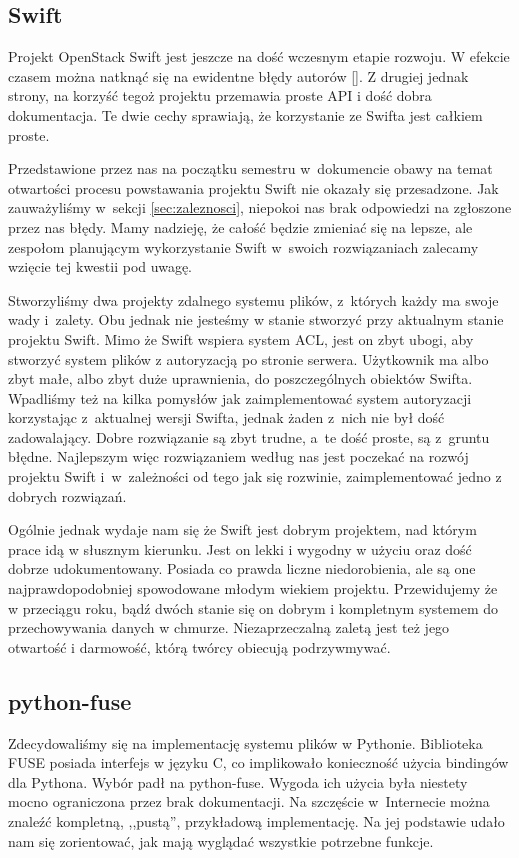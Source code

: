 \subsection{Swift}

Projekt OpenStack Swift jest jeszcze na dość wczesnym etapie rozwoju. W
efekcie czasem można natknąć się na ewidentne błędy autorów []. Z drugiej jednak strony, na korzyść tegoż projektu przemawia proste
API i dość dobra dokumentacja. Te dwie cechy sprawiają, że korzystanie ze
Swifta jest całkiem proste.

Przedstawione przez nas na początku semestru w~dokumencie \cite{jano-anal-atech}
obawy na temat otwartości procesu powstawania projektu Swift nie okazały się
przesadzone. Jak zauważyliśmy w~sekcji \ref{sec:zaleznosci}, niepokoi nas brak
odpowiedzi na zgłoszone przez nas błędy. Mamy nadzieję, że całość będzie
zmieniać się na lepsze, ale zespołom planującym wykorzystanie Swift w~swoich
rozwiązaniach zalecamy wzięcie tej kwestii pod uwagę.

Stworzyliśmy dwa projekty zdalnego systemu plików, z~których każdy ma swoje
wady i~zalety. Obu jednak nie jesteśmy w stanie stworzyć przy aktualnym stanie
projektu Swift. Mimo że Swift wspiera system ACL, jest on zbyt ubogi, aby
stworzyć system plików z autoryzacją po stronie serwera. Użytkownik ma albo zbyt
małe, albo zbyt duże uprawnienia, do poszczególnych obiektów Swifta. Wpadliśmy
też na kilka pomysłów jak zaimplementować system autoryzacji korzystając
z~aktualnej wersji Swifta, jednak żaden z~nich nie był dość zadowalający. Dobre
rozwiązanie są zbyt trudne, a~te dość proste, są z~gruntu błędne. Najlepszym
więc rozwiązaniem według nas jest poczekać na rozwój projektu Swift
i~w~zależności od tego jak się rozwinie, zaimplementować jedno z dobrych
rozwiązań.

Ogólnie jednak wydaje nam się że Swift jest dobrym projektem, nad którym prace
idą w słusznym kierunku. Jest on lekki i wygodny w użyciu oraz dość dobrze
udokumentowany. Posiada co prawda liczne niedorobienia, ale są one
najprawdopodobniej spowodowane młodym wiekiem projektu. Przewidujemy że w
przeciągu roku, bądź dwóch stanie się on dobrym i kompletnym systemem
do przechowywania danych w chmurze. Niezaprzeczalną zaletą jest też jego
otwartość i darmowość, którą twórcy obiecują podrzywmywać.

\subsection{python-fuse}

Zdecydowaliśmy się na implementację systemu plików w Pythonie. Biblioteka FUSE
posiada interfejs w języku C, co implikowało konieczność użycia bindingów dla
Pythona. Wybór padł na python-fuse. Wygoda ich użycia była niestety mocno
ograniczona przez brak dokumentacji. Na szczęście w~Internecie można znaleźć
kompletną, ,,pustą'', przykładową implementację. Na jej podstawie udało nam się
zorientować, jak mają wyglądać wszystkie potrzebne funkcje.


